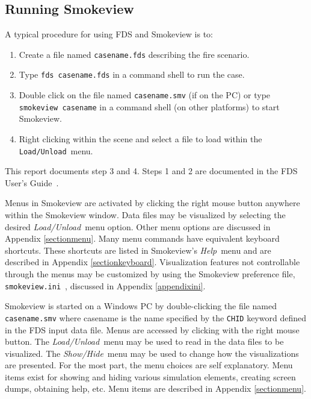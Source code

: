 \documentclass[11pt,twoside]{book}
\newcommand{\svini}{{\tt smokeview.ini}\ }
\begin{document}

\subsection{Running Smokeview}

A typical procedure for using FDS and Smokeview is to:
\begin{enumerate}

\item Create a file named {\tt casename.fds} describing the fire
scenario.

\item Type {\tt fds~casename.fds} in a command shell to run the
case.

\item Double click on the file named {\tt casename.smv} (if on the
PC) or type {\tt smokeview~casename} in a command shell (on other
platforms) to start Smokeview.

\item Right clicking within the scene and select a file to load
within the {\tt Load/Unload}\ menu.
\end{enumerate}

\noindent This report documents step 3 and 4. Steps 1 and 2 are
documented in the FDS User's Guide~\cite{FDS_Users_Guide}.

Menus in Smokeview are activated by clicking the right mouse
button anywhere within the Smokeview window.  Data files may be
visualized by selecting the desired {\em Load/Unload}\ menu
option. Other menu options are discussed in Appendix
\ref{sectionmenu}. Many menu commands have equivalent keyboard
shortcuts. These shortcuts are listed in Smokeview's {\em Help}\
menu and are described in Appendix \ref{sectionkeyboard}.
Visualization features not controllable through the menus may be
customized by using the Smokeview preference file, \svini,
discussed in Appendix \ref{appendixini}.

Smokeview  is started on a Windows PC by double-clicking the file
named {\tt casename.smv} where casename is the name specified by
the {\tt CHID} keyword defined in the FDS input data file. Menus
are accessed by clicking with the right mouse button.  The {\em
Load/Unload}\ menu may be used to read in the data files to be
visualized. The {\em Show/Hide}\ menu may be used to change how
the visualizations are presented. For the most part, the menu
choices are self explanatory. Menu items exist for showing and
hiding various simulation elements, creating screen dumps,
obtaining help, etc. Menu items are described in Appendix
\ref{sectionmenu}.
\end{document}
